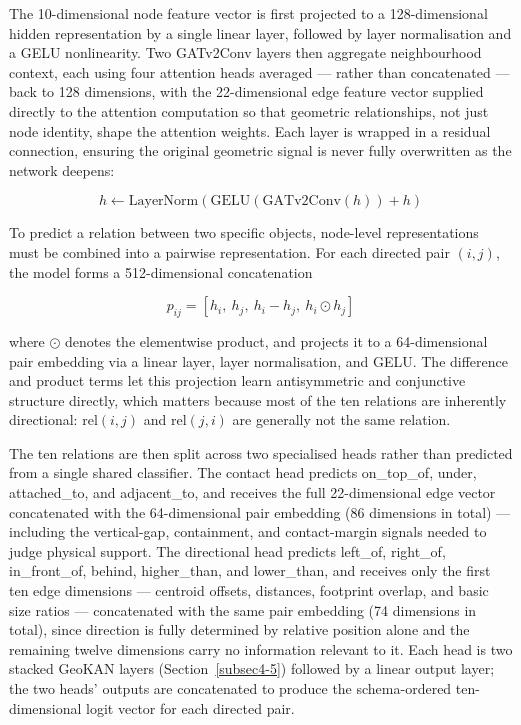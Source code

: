 \documentclass[sn-mathphys,Numbered]{sn-jnl}
\begin{document}
The 10-dimensional node feature vector is first projected to a 128-dimensional hidden representation by a single linear layer, followed by layer normalisation and a GELU nonlinearity. Two GATv2Conv layers then aggregate neighbourhood context, each using four attention heads averaged --- rather than concatenated --- back to 128 dimensions, with the 22-dimensional edge feature vector supplied directly to the attention computation so that geometric relationships, not just node identity, shape the attention weights. Each layer is wrapped in a residual connection, ensuring the original geometric signal is never fully overwritten as the network deepens:

\begin{equation}
h \leftarrow \mathrm{LayerNorm}\!\left(\mathrm{GELU}(\mathrm{GATv2Conv}(h)) + h\right)
\label{eq:residual}
\end{equation}

To predict a relation between two specific objects, node-level representations must be combined into a pairwise representation. For each directed pair $(i, j)$, the model forms a 512-dimensional concatenation

\begin{equation}
p_{ij} = \left[h_i,\ h_j,\ h_i - h_j,\ h_i \odot h_j\right]
\label{eq:pairconcat}
\end{equation}

where $\odot$ denotes the elementwise product, and projects it to a 64-dimensional pair embedding via a linear layer, layer normalisation, and GELU. The difference and product terms let this projection learn antisymmetric and conjunctive structure directly, which matters because most of the ten relations are inherently directional: $\text{rel}(i,j)$ and $\text{rel}(j,i)$ are generally not the same relation.

The ten relations are then split across two specialised heads rather than predicted from a single shared classifier. The contact head predicts on\_top\_of, under, attached\_to, and adjacent\_to, and receives the full 22-dimensional edge vector concatenated with the 64-dimensional pair embedding (86 dimensions in total) --- including the vertical-gap, containment, and contact-margin signals needed to judge physical support. The directional head predicts left\_of, right\_of, in\_front\_of, behind, higher\_than, and lower\_than, and receives only the first ten edge dimensions --- centroid offsets, distances, footprint overlap, and basic size ratios --- concatenated with the same pair embedding (74 dimensions in total), since direction is fully determined by relative position alone and the remaining twelve dimensions carry no information relevant to it. Each head is two stacked GeoKAN layers (Section~\ref{subsec4-5}) followed by a linear output layer; the two heads' outputs are concatenated to produce the schema-ordered ten-dimensional logit vector for each directed pair.
\end{document}
